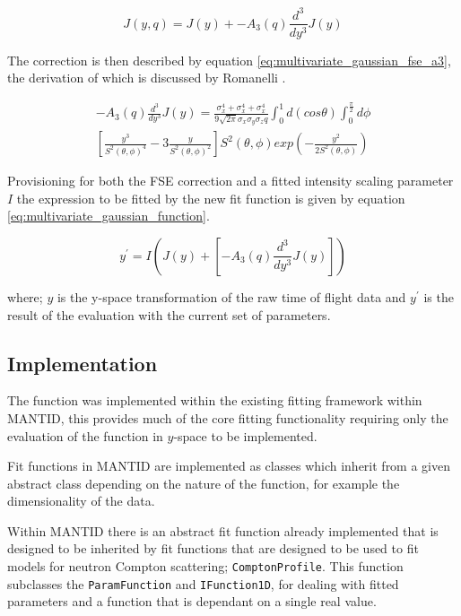 \documentclass[a4paper]{article}
\begin{document}
\begin{equation}
  \label{eq:mvg_fse_corr_a3only}
  J(y, q) = J(y) + - A_{3}(q) \frac{d^{3}}{dy^{3}} J(y)
\end{equation}

The correction is then described by equation
\ref{eq:multivariate_gaussian_fse_a3}, the derivation of which is discussed by
Romanelli \cite{Romanelli2015}.

\begin{multline}
  \label{eq:multivariate_gaussian_fse_a3}
  -A_{3}(q)\frac{d^{3}}{dy^{3}}J(y) =
    \frac{\sigma_{x}^{4} + \sigma_{x}^{4} + \sigma_{x}^{4}}
         {9 \sqrt{2 \pi} \sigma_{x} \sigma_{y} \sigma_{z} q}
    \int_{0}^{1} d(cos \theta)
    \int_{0}^{\frac{\pi}{2}} d \phi \\
    \left[
      \frac{y^{3}}{S^{2}(\theta, \phi)^{4}}
      -3 \frac{y}{S^{2}(\theta, \phi)^{2}}
    \right]
    S^{2}(\theta, \phi)
    exp \left( -\frac{y^{2}}{2S^{2}(\theta, \phi)} \right)
\end{multline}

Provisioning for both the \gls*{FSE} correction and a fitted intensity scaling
parameter $I$ the expression to be fitted by the new fit function is given by
equation \ref{eq:multivariate_gaussian_function}.

\begin{equation}
  \label{eq:multivariate_gaussian_function}
  y^{\prime} =
    I \left( J(y) + \left[ -A_{3}(q)\frac{d^{3}}{dy^{3}}J(y) \right] \right)
\end{equation}

where; $y$ is the y-space transformation of the raw time of flight data and
$y^{\prime}$ is the result of the evaluation with the current set of parameters.

\subsection{Implementation}
\label{sec:mvg_implementation}

The function was implemented within the existing fitting framework within
\gls*{MANTID}, this provides much of the core fitting functionality requiring
only the evaluation of the function in $y$-space to be implemented.

Fit functions in \gls*{MANTID} are implemented as classes which inherit from a
given abstract class depending on the nature of the function, for example the
dimensionality of the data.

Within \gls*{MANTID} there is an abstract fit function already implemented that
is designed to be inherited by fit functions that are designed to be used to fit
models for neutron Compton scattering; \texttt{ComptonProfile}. This function
subclasses the \texttt{ParamFunction} and \texttt{IFunction1D}, for dealing with
fitted parameters and a function that is dependant on a single real value.
\end{document}
